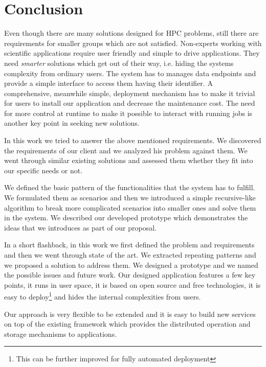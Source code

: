 \chapter{Conclusion}
\label{cha:conclusion}

Even though there are many solutions designed for HPC problems, 
still there are requirements for smaller groups which are not satisfied.
Non-experts working with scientific applications require user friendly and simple to drive applications.
They need \textit{smarter} solutions which get out of their way, i.e. hiding the systems complexity from ordinary users.
The system has to manages data endpoints and provide a simple interface to access them having their identifier.
A comprehensive, meanwhile simple, deployment mechanism has to make it trivial for users to install our application and decrease 
the maintenance cost.
The need for more control at runtime to make it possible to interact with running jobs is another key point in seeking new solutions.

In this work we tried to answer the above mentioned requirements.
We discovered the requirements of our client and we analyzed his problem against them.
We went through similar existing solutions and assessed them whether they fit into our specific needs or not.

We defined the basic pattern of the functionalities that the system has to fulfill. 
We formulated them as scenarios and then we introduced a simple recursive-like algorithm 
to break more complicated scenarios into smaller ones and solve them in the system.
We described our developed prototype which demonstrates the ideas that we introduces as part of our proposal.

In a short flashback, 
in this work we first defined the problem and requirements and then we went through
state of the art. We extracted repeating patterns and we proposed a solution to address them.
We designed a prototype and we named the possible issues and future work. 
Our designed application features a few key points, it runs in user space, 
it is based on open source and free technologies, it is easy to deploy\footnote{This can be further improved for fully automated deployment}
and hides the internal complexities from users.

Our approach is very flexible to be extended and it is easy to build new services on top of the existing framework 
which provides the distributed operation and storage mechanisms to applications.

